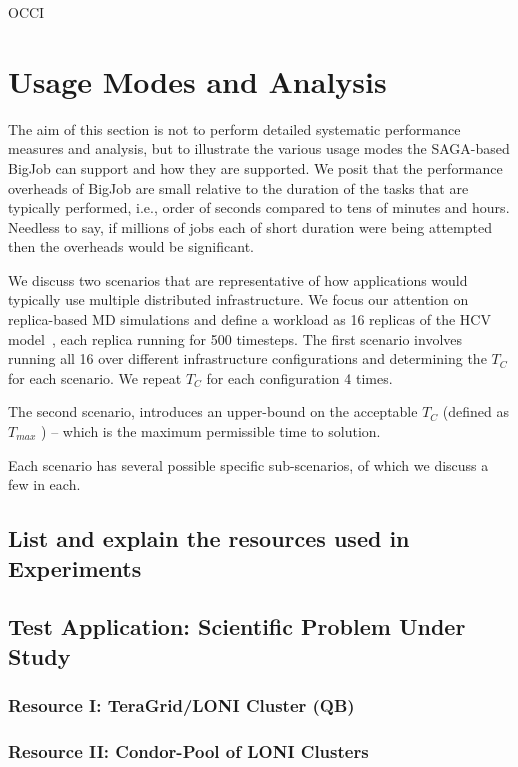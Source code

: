 \documentclass[conference,final]{IEEEtran}
\newcommand{\numrep}{16 }
\newcommand{\samplenum}{4 }
\newcommand{\tmax}{$T_{max}$ }
\newcommand{\tc}{$T_{C}$ }
\begin{document}
OCCI

\section{Usage Modes and Analysis}

The aim of this section is not to perform detailed systematic
performance measures and analysis, but to illustrate the various usage
modes the SAGA-based BigJob can support and how they are supported. We
posit that the performance overheads of BigJob are small relative to
the duration of the tasks that are typically performed, i.e., order of
seconds compared to tens of minutes and hours.  Needless to say, if
millions of jobs each of short duration were being attempted then the
overheads would be significant.

We discuss two scenarios that are representative of how applications
would typically use multiple distributed infrastructure. We focus our
attention on replica-based MD simulations and define a workload as
\numrep replicas of the HCV model~\cite{}, each replica running for
500 timesteps.  The first scenario involves running all \numrep over
different infrastructure configurations and determining the \tc for
each scenario. We repeat \tc for each configuration \samplenum times.

The second scenario, introduces an upper-bound on the acceptable \tc
(defined as \tmax) -- which is the maximum permissible time to
solution.

Each scenario has several possible specific sub-scenarios, of which we
discuss a few in each.

\subsection{List and explain the resources used in Experiments}

\subsection{Test Application: Scientific Problem Under Study}

\subsubsection*{Resource I: TeraGrid/LONI Cluster (QB)}

\subsubsection*{Resource II: Condor-Pool of LONI Clusters}
\end{document}
